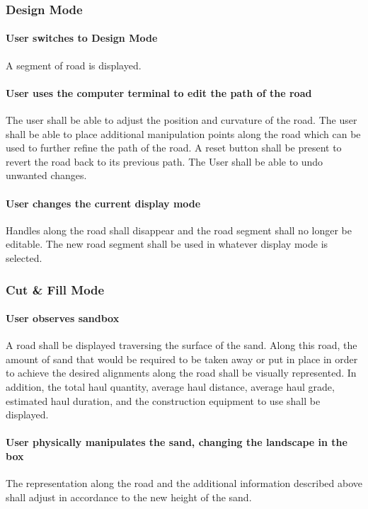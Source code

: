 \documentclass[onecolumn, draftclsnofoot,10pt, compsoc]{IEEEtran}
\begin{document}
\subsubsection{Design Mode}

\paragraph{User switches to Design Mode}
A segment of road is displayed.

\paragraph{User uses the computer terminal to edit the path of the road}
The user shall be able to adjust the position and curvature of the road.
The user shall be able to place additional manipulation points along the road which can be used to further refine the path of the road.
A reset button shall be present to revert the road back to its previous path.
The User shall be able to undo unwanted changes.

\paragraph{User changes the current display mode}
Handles along the road shall disappear and the road segment shall no longer be editable.
The new road segment shall be used in whatever display mode is selected.

\subsubsection{Cut \& Fill Mode}

\paragraph{User observes sandbox}
A road shall be displayed traversing the surface of the sand.  Along this road, the amount of sand that would be required to be taken away or put in place in order to achieve the desired alignments along the road shall be visually represented.  In addition, the total haul quantity, average haul distance, average haul grade, estimated haul duration, and the construction equipment to use shall be displayed.

\paragraph{User physically manipulates the sand, changing the landscape in the box}
The representation along the road and the additional information described above shall adjust in accordance to the new height of the sand.
\end{document}
